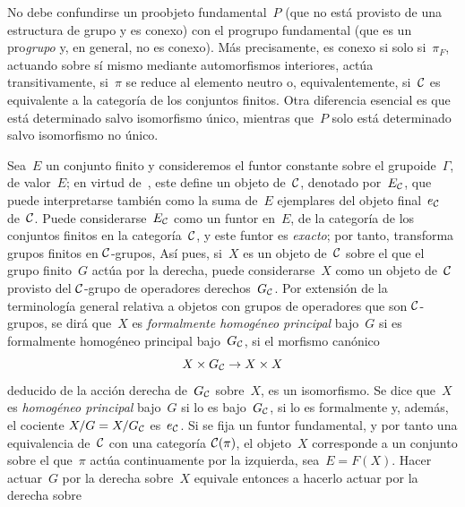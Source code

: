 \begin{remarque}
\label{V.5.11}
No debe confundirse un proobjeto fundamental~$P$ (que no está provisto de
una estructura de grupo y es conexo) con el progrupo fundamental (que es un
pro\emph{grupo} y, en general, no es conexo). Más precisamente,
es conexo si
solo si~$\pi_F$, actuando sobre sí mismo mediante automorfismos interiores,
actúa transitivamente, \ie si~$\pi$ se reduce al elemento neutro o,
equivalentemente, si~$\cal{C}$ es equivalente a la categoría de los
conjuntos finitos. Otra diferencia
esencial es que
está determinado salvo isomorfismo único, mientras que~$P$ solo está
determinado salvo isomorfismo no único.

Sea~$E$ un conjunto finito y consideremos el funtor constante sobre el
grupoide~$\Gamma$, de valor~$E$; en virtud de~, este define un
objeto de~$\cal{C}$, denotado por~$E_{\cal{C}}$, que puede interpretarse
también como la suma de~$E$ ejemplares del objeto final~$e_{\cal{C}}$
de~$\cal{C}$. Puede considerarse~$E_{\cal{C}}$ como un funtor en~$E$, de la
categoría de los conjuntos finitos en la categoría~$\cal{C}$, y este funtor
es \emph{exacto}; por tanto, transforma grupos finitos en
$\cal{C}$-grupos,
Así pues, si~$X$ es un objeto de~$\cal{C}$ sobre el que el grupo finito~$G$
actúa por la derecha, puede considerarse~$X$ como un objeto de~$\cal{C}$
provisto del $\cal{C}$-grupo de operadores derechos~$G_{\cal{C}}$. Por
extensión de la terminología general relativa a objetos con grupos de
operadores que son $\cal{C}$-grupos, se dirá que~$X$ es \emph{formalmente
homogéneo principal}
%
bajo~$G$ si es formalmente homogéneo principal bajo~$G_{\cal{C}}$, \ie si
el morfismo canónico
$$
X\times G_{\cal{C}}\to X\times X
$$
deducido de la acción derecha de~$G_{\cal{C}}$ sobre~$X$, es un
isomorfismo. Se dice que~$X$ es \emph{homogéneo principal}
%
bajo~$G$ si lo es bajo~$G_{\cal{C}}$, \ie si lo es formalmente y, además,
el cociente $X/G=X/G_{\cal{C}}$ es~$e_{\cal{C}}$. Si se fija un funtor
fundamental, y por tanto una equivalencia de~$\cal{C}$ con una categoría
$\cal{C}(\pi)$, el objeto~$X$ corresponde a un conjunto sobre el que~$\pi$
actúa continuamente por la izquierda, sea~$E=F(X)$. Hacer actuar~$G$ por la
derecha sobre~$X$ equivale entonces a hacerlo actuar por la derecha sobre

\end{remarque}

